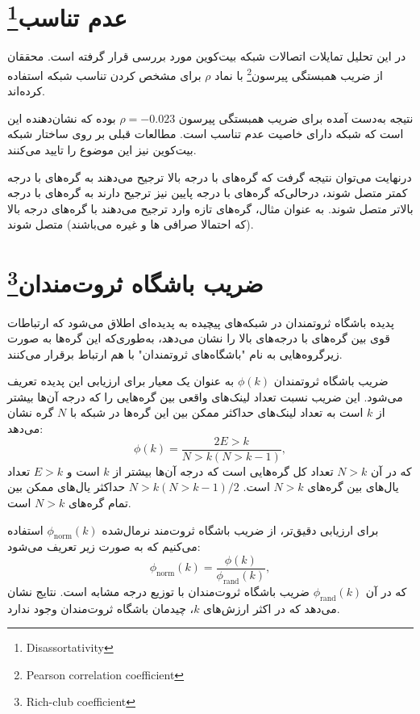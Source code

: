 \section{عدم تناسب\footnote{Disassortativity}}
در این تحلیل تمایلات اتصالات شبکه بیت‌کوین مورد بررسی قرار گرفته است. محققان از ضریب همبستگی پیرسون\footnote{Pearson correlation coefficient} با نماد $\rho$ برای مشخص کردن تناسب شبکه استفاده کرده‌اند.


نتیجه به‌دست آمده برای ضریب همبستگی پیرسون $\rho = -0.023$ بوده که نشان‌دهنده این است که شبکه دارای خاصیت عدم تناسب است. مطالعات قبلی بر روی ساختار شبکه بیت‌کوین نیز این موضوع را تایید می‌کنند.

درنهایت می‌توان نتیجه گرفت که گره‌های با درجه بالا ترجیح می‌دهند به گره‌های با درجه کمتر متصل شوند، درحالی‌که گره‌های با درجه پایین نیز ترجیح دارند به گره‌های با درجه بالاتر متصل شوند.
به عنوان مثال، گره‌های تازه وارد ترجیح می‌دهند با گره‌های درجه بالا (که احتمالا صرافی ها و غیره می‌باشند) متصل شوند.


\section{ضریب باشگاه ثروت‌مندان\footnote{Rich-club coefficient}}
پدیده باشگاه ثروتمندان در شبکه‌های پیچیده به پدیده‌ای اطلاق می‌شود که ارتباطات قوی بین گره‌های با درجه‌های بالا را نشان می‌دهد، به‌طوری‌که این گره‌ها به صورت زیرگروه‌هایی به نام "باشگاه‌های ثروتمندان" با هم ارتباط‌ برقرار می‌کنند.

ضریب باشگاه ثروتمندان $\phi(k)$ به عنوان یک معیار برای ارزیابی این پدیده تعریف می‌شود. این ضریب نسبت تعداد لینک‌های واقعی بین گره‌هایی را که درجه آن‌ها بیشتر از $k$ است به تعداد لینک‌های حداکثر ممکن بین این گره‌ها در شبکه با $N$ گره نشان می‌دهد:
\[
\phi(k) = \frac{2E>k}{N>k (N>k - 1)},
\]
که در آن $N>k$ تعداد کل گره‌هایی است که درجه آن‌ها بیشتر از $k$ است و $E>k$ تعداد یال‌های بین گره‌های $N>k$ است. $N>k (N>k - 1)/2$ حداکثر یال‌های ممکن بین تمام گره‌های $N>k$ است.

برای ارزیابی دقیق‌تر، از ضریب باشگاه ثروت‌مند نرمال‌شده $\phi_{\text{norm}}(k)$ استفاده می‌کنیم که به صورت زیر تعریف می‌شود:
\[
\phi_{\text{norm}}(k) = \frac{\phi(k)}{\phi_{\text{rand}}(k)},
\]
که در آن $\phi_{\text{rand}}(k)$ ضریب باشگاه ثروت‌مندان با توزیع درجه مشابه است. نتایج نشان می‌دهد که در اکثر ارزش‌های $k$، چیدمان باشگاه ثروت‌مندان وجود ندارد.

